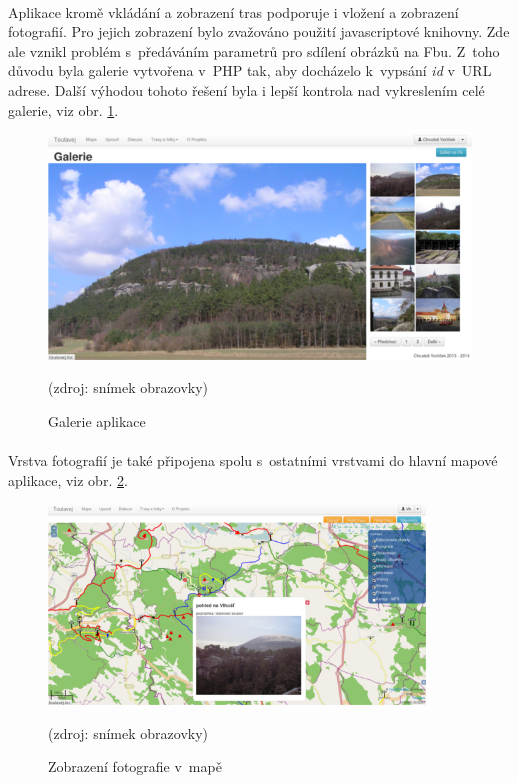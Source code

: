 \documentclass[11pt,a4paper,titlepage,oneside]{book}
\begin{document}
			\paragraph{} Aplikace kromě vkládání a zobrazení tras podporuje i vložení a zobrazení fotografií. Pro jejich zobrazení bylo zvažováno použití javascriptové knihovny. Zde ale vznikl problém s~předáváním parametrů pro sdílení obrázků na \acl{Fb}u. Z~toho důvodu byla galerie vytvořena v~PHP tak, aby dochá\-zelo k~vypsání \textit{id} v~URL adrese. Další výhodou tohoto řešení byla i lepší kontrola nad vykreslením celé galerie, viz obr. \ref{fig:gallery}.
		\begin{figure}[!h]
			\begin{center}
				\includegraphics[width=12cm]{obrazky/toulavej/gallery.png}
				\caption{Galerie aplikace }
				\label{fig:gallery}
				(zdroj: snímek obrazovky)
			\end{center}
		\end{figure}
			\paragraph{} Vrstva fotografií je také připojena spolu s~ostatními vrstvami do hlavní mapové aplikace, viz obr. \ref{fig:vlhost}.

		\begin{figure}[!h]
			\begin{center}
				\includegraphics[width=10cm]{obrazky/toulavej/mapa2_vlhost.png}
				\caption{Zobrazení fotografie v~mapě}
				\label{fig:vlhost}
				(zdroj: snímek obrazovky)
			\end{center}
		\end{figure}	
\end{document}
